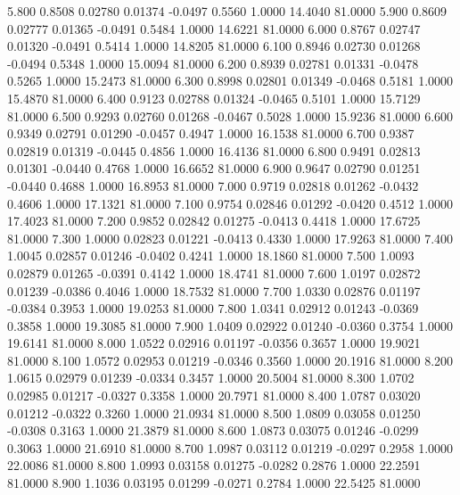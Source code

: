    5.800   0.8508   0.02780   0.01374  -0.0497   0.5560   1.0000  14.4040  81.0000
   5.900   0.8609   0.02777   0.01365  -0.0491   0.5484   1.0000  14.6221  81.0000
   6.000   0.8767   0.02747   0.01320  -0.0491   0.5414   1.0000  14.8205  81.0000
   6.100   0.8946   0.02730   0.01268  -0.0494   0.5348   1.0000  15.0094  81.0000
   6.200   0.8939   0.02781   0.01331  -0.0478   0.5265   1.0000  15.2473  81.0000
   6.300   0.8998   0.02801   0.01349  -0.0468   0.5181   1.0000  15.4870  81.0000
   6.400   0.9123   0.02788   0.01324  -0.0465   0.5101   1.0000  15.7129  81.0000
   6.500   0.9293   0.02760   0.01268  -0.0467   0.5028   1.0000  15.9236  81.0000
   6.600   0.9349   0.02791   0.01290  -0.0457   0.4947   1.0000  16.1538  81.0000
   6.700   0.9387   0.02819   0.01319  -0.0445   0.4856   1.0000  16.4136  81.0000
   6.800   0.9491   0.02813   0.01301  -0.0440   0.4768   1.0000  16.6652  81.0000
   6.900   0.9647   0.02790   0.01251  -0.0440   0.4688   1.0000  16.8953  81.0000
   7.000   0.9719   0.02818   0.01262  -0.0432   0.4606   1.0000  17.1321  81.0000
   7.100   0.9754   0.02846   0.01292  -0.0420   0.4512   1.0000  17.4023  81.0000
   7.200   0.9852   0.02842   0.01275  -0.0413   0.4418   1.0000  17.6725  81.0000
   7.300   1.0000   0.02823   0.01221  -0.0413   0.4330   1.0000  17.9263  81.0000
   7.400   1.0045   0.02857   0.01246  -0.0402   0.4241   1.0000  18.1860  81.0000
   7.500   1.0093   0.02879   0.01265  -0.0391   0.4142   1.0000  18.4741  81.0000
   7.600   1.0197   0.02872   0.01239  -0.0386   0.4046   1.0000  18.7532  81.0000
   7.700   1.0330   0.02876   0.01197  -0.0384   0.3953   1.0000  19.0253  81.0000
   7.800   1.0341   0.02912   0.01243  -0.0369   0.3858   1.0000  19.3085  81.0000
   7.900   1.0409   0.02922   0.01240  -0.0360   0.3754   1.0000  19.6141  81.0000
   8.000   1.0522   0.02916   0.01197  -0.0356   0.3657   1.0000  19.9021  81.0000
   8.100   1.0572   0.02953   0.01219  -0.0346   0.3560   1.0000  20.1916  81.0000
   8.200   1.0615   0.02979   0.01239  -0.0334   0.3457   1.0000  20.5004  81.0000
   8.300   1.0702   0.02985   0.01217  -0.0327   0.3358   1.0000  20.7971  81.0000
   8.400   1.0787   0.03020   0.01212  -0.0322   0.3260   1.0000  21.0934  81.0000
   8.500   1.0809   0.03058   0.01250  -0.0308   0.3163   1.0000  21.3879  81.0000
   8.600   1.0873   0.03075   0.01246  -0.0299   0.3063   1.0000  21.6910  81.0000
   8.700   1.0987   0.03112   0.01219  -0.0297   0.2958   1.0000  22.0086  81.0000
   8.800   1.0993   0.03158   0.01275  -0.0282   0.2876   1.0000  22.2591  81.0000
   8.900   1.1036   0.03195   0.01299  -0.0271   0.2784   1.0000  22.5425  81.0000
